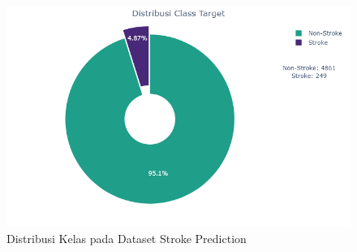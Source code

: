 \documentclass[10pt]{article}
\begin{document}
\begin{multicols}{2}
    \begin{figure}[H]
        \includegraphics[width=\columnwidth]{./assets/class-distribution.png}
        \caption{Distribusi Kelas pada Dataset Stroke Prediction}%
        \label{fig:class-distribution}
    \end{figure}


\end{multicols}
\end{document}
